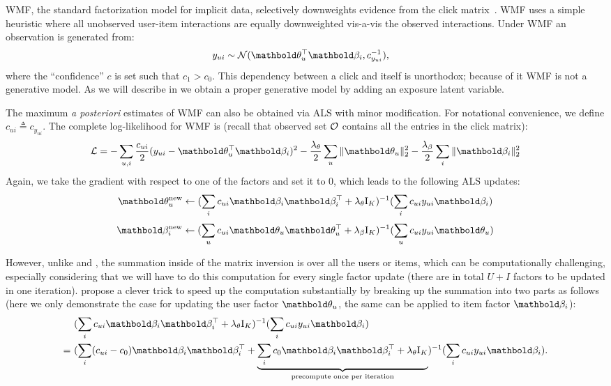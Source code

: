 \gls{WMF}, the standard factorization model for implicit
data, selectively downweights evidence from the click
matrix~\citep{hu2008collaborative}.  \gls{WMF} uses a simple heuristic where all
unobserved user-item interactions are equally downweighted vis-a-vis the
observed interactions. Under \gls{WMF} an observation is generated from:
\begin{align*} 
y_{ui} &\sim \mathcal{N}(\mb\theta_u^\top\mb\beta_i, c^{-1}_{y_{ui}}),
\end{align*}
where the ``confidence'' $c$ is set such that $c_1 > c_0$. This dependency between a
click and itself is unorthodox; because of it \gls{WMF} is not a generative
model. As we will describe in  we obtain a proper generative
model by adding an exposure latent variable. 

The maximum \textit{a posteriori} estimates of \gls{WMF} can also be obtained via ALS with minor modification. For notational convenience, we define $c_{ui} \triangleq c_{y_{ui}}$. The complete log-likelihood for \gls{WMF} is (recall that observed set $\mathcal{O}$ contains all the entries in the click matrix):
\begin{equation*}
\cL = -\sum_{u, i} \frac{c_{ui}}{2}(y_{ui} - \mb\theta_u^\top\mb\beta_i)^2 - \frac{\lambda_\theta}{2} \sum_u \|\mb\theta_u \|^2_2 - \frac{\lambda_\beta}{2} \sum_i \|\mb\beta_i \|_2^2
\end{equation*}
Again, we take the gradient with respect to one of the factors and set it to $0$, which leads to the following ALS updates:
\begin{equation}
\mb\theta_u^\new \leftarrow (\sum_i c_{ui} \mb\beta_i \mb\beta_i^\top + \lambda_\theta \mathrm{I}_K)^{-1} (\sum_i c_{ui} y_{ui} \mb\beta_i)
\label{chpt:background:eq:wals_user}
\end{equation}
\begin{equation}
\mb\beta_i^\new \leftarrow (\sum_u c_{ui} \mb\theta_u \mb\theta_u^\top + \lambda_\beta \mathrm{I}_K)^{-1} (\sum_u c_{ui} y_{ui} \mb\theta_u)
\label{chpt:background:eq:wals_item}
\end{equation}

However, unlike  and , the summation inside of the matrix inversion is over all the users or items, which can be computationally challenging, especially considering that we will have to do this computation for every single factor update (there are in total $U + I$ factors to be updated in one iteration). \citet{hu2008collaborative} propose a clever trick to speed up the computation substantially by breaking up the summation into two parts as follows (here we only demonstrate the case for updating the user factor $\mb\theta_u$, the same can be applied to item factor $\mb\beta_i$):
\begin{align*}
&(\sum_i c_{ui} \mb\beta_i \mb\beta_i^\top + \lambda_\theta \mathrm{I}_K)^{-1} (\sum_i c_{ui} y_{ui} \mb\beta_i)\\
=~& (\sum_i (c_{ui} - c_0) \mb\beta_i \mb\beta_i^\top + \underbrace{\sum_i c_0 \mb\beta_i \mb\beta_i^\top + \lambda_\theta \mathrm{I}_K}_{\textrm{precompute once per iteration}})^{-1} (\sum_i c_{ui} y_{ui} \mb\beta_i).
\end{align*}

